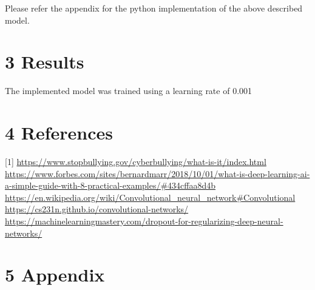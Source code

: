 \documentclass[12pt]{report}
\begin{document}
Please refer the appendix for the python implementation of the above described model. 
\newpage

\section*{3 Results}
The implemented model was trained using a learning rate of 0.001 


 
\newpage
\section*{4 References}
[1] \url{https://www.stopbullying.gov/cyberbullying/what-is-it/index.html} \\ \newline
[2] \url{https://www.forbes.com/sites/bernardmarr/2018/10/01/what-is-deep-learning-ai-a-simple-guide-with-8-practical-examples/#434cffaa8d4b} \\ \newline
[3] \url{https://en.wikipedia.org/wiki/Convolutional_neural_network#Convolutional} \\ \newline
[4] \url{https://cs231n.github.io/convolutional-networks/} \\ \newline
[5] \url{https://machinelearningmastery.com/dropout-for-regularizing-deep-neural-networks/}

\newpage

\section*{5 Appendix}
\end{document}
